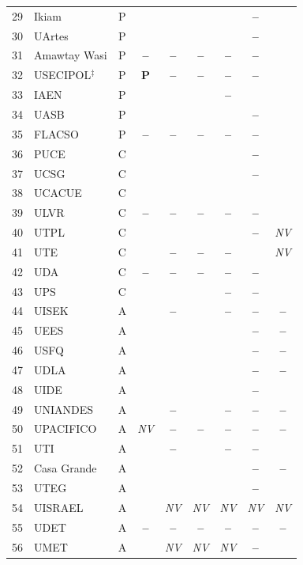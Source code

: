 \documentclass[pdflatex,sn-basic,Numbered,iicol]{sn-jnl}
\newcommand{\si}{\ding{51}}
\newcommand{\no}{\textcolor{gris}{\textbf{--}}}
\newcommand{\pc}{\textbf{P}}
\newcommand{\nv}{\textsl{\footnotesize NV}}
\theoremstyle{thmstyleone}
\theoremstyle{thmstyletwo}
\theoremstyle{thmstylethree}
\begin{document}
\begin{appendices}
\begin{longtable}{@{}r l c c c c c c c@{}}
	29 & Ikiam & P & \si & \si & \si & \si & \no & \si \\
	30 & UArtes & P & \si & \si & \si & \si & \no & \si \\
	31 & Amawtay Wasi & P & \no & \no & \no & \no & \no & \si \\
	32 & USECIPOL$^\ddagger$ & P & \pc & \no & \no & \no & \no & \si \\
	33 & IAEN & P & \si & \si & \si & \no & \si & \si \\
	34 & UASB & P & \si & \si & \si & \si & \no & \si \\
	35 & FLACSO & P & \no & \no & \no & \no & \no & \si \\
	36 & PUCE & C & \si & \si & \si & \si & \no & \si \\
	37 & UCSG & C & \si & \si & \si & \si & \no & \si \\
	38 & UCACUE & C & \si & \si & \si & \si & \si & \si \\
	39 & ULVR & C & \no & \no & \no & \no & \no & \si \\
	40 & UTPL & C & \si & \si & \si & \si & \no & \nv \\
	41 & UTE & C & \si & \no & \no & \no & \si & \nv \\
	42 & UDA & C & \no & \no & \no & \no & \no & \si \\
	43 & UPS & C & \si & \si & \si & \no & \no & \si \\
	44 & UISEK & A & \si & \no & \si & \no & \no & \no \\
	45 & UEES & A & \si & \si & \si & \si & \no & \no \\
	46 & USFQ & A & \si & \si & \si & \si & \no & \no \\
	47 & UDLA & A & \si & \si & \si & \si & \no & \no \\
	48 & UIDE & A & \si & \si & \si & \si & \no & \si \\
	49 & UNIANDES & A & \si & \no & \si & \no & \no & \no \\
	50 & UPACIFICO & A & \nv & \no & \no & \no & \no & \no \\
	51 & UTI & A & \si & \no & \si & \no & \no & \si \\
	52 & Casa Grande & A & \si & \si & \si & \si & \no & \no \\
	53 & UTEG & A & \si & \si & \si & \si & \no & \si \\
	54 & UISRAEL & A & \si & \nv & \nv & \nv & \nv & \nv \\
	55 & UDET & A & \no & \no & \no & \no & \no & \no \\
	56 & UMET & A & \si & \nv & \nv & \nv & \no & \si \\

\end{longtable}
\end{appendices}
\end{document}

